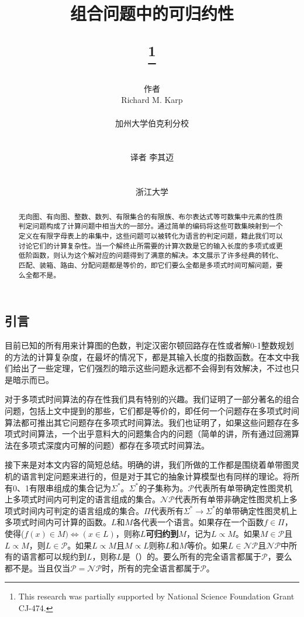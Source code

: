 \documentclass[twocolumn]{article}
\title{
    \begin{CJK}{UTF8}{gbsn}
    组合问题中的可归约性
    \end{CJK}
    \thanks{This research was partially supported by National Science Foundation Grant CJ-474.}
}
\author{
    \begin{CJK}{UTF8}{gbsn}
    作者
    \end{CJK}
    Richard M. Karp\\
    \begin{CJK}{UTF8}{gbsn}
    加州大学伯克利分校
    \end{CJK}
    \\
    \begin{CJK}{UTF8}{gbsn}
    译者 李其迈
    \end{CJK}
    \\
    \begin{CJK}{UTF8}{gbsn}
    浙江大学
    \end{CJK}
}
\date{}
\theoremstyle{nonumberplain}%
\begin{document}
\maketitle

\begin{CJK}{UTF8}{gbsn}
\renewcommand\abstractname{摘要}
\begin{abstract}
无向图、有向图、整数、数列、有限集合的有限族、布尔表达式等可数集中元素的性质判定问题构成了计算问题中相当大的一部分。通过简单的编码将这些可数集映射到一个定义在有限字母表上的串集中，这些问题可以被转化为语言的判定问题，籍此我们可以讨论它们的计算复杂性。当一个解终止所需要的计算次数是它的输入长度的多项式或更低阶函数，则认为这个解对应的问题得到了满意的解决。本文展示了许多经典的转化、匹配、装箱、路由、分配问题都是等价的，即它们要么全都是多项式时间可解问题，要么全都不是。
\end{abstract}

\section{引言}

    目前已知的所有用来计算图的色数，判定汉密尔顿回路存在性或者解0-1整数规划的方法的计算复杂度，在最坏的情况下，都是其输入长度的指数函数。在本文中我们给出了一些定理，它们强烈的暗示这些问题永远都不会得到有效解决，不过也只是暗示而已。

    对于多项式时间算法的存在性我们具有特别的兴趣。我们证明了一部分著名的组合问题，包括上文中提到的那些，它们都是等价的，即任何一个问题存在多项式时间算法都可推出其它问题存在多项式时间算法。我们也证明了，如果这些问题存在多项式时间算法，一个出乎意料大的问题集合内的问题（简单的讲，所有通过回溯算法在多项式深度内可解的问题）都存在多项式时间算法。

    接下来是对本文内容的简短总结。明确的讲，我们所做的工作都是围绕着单带图灵机的语言判定问题来进行的，但是对于其它的抽象计算模型也有同样的理论。将所有0、1有限串组成的集合记为$\Sigma^*$。$\Sigma^*$的子集称为{}。$\mathcal{P}$代表所有单带确定性图灵机上多项式时间内可判定的语言组成的集合。$\mathcal{NP}$代表所有单带非确定性图灵机上多项式时间内可判定的语言组成的集合。$\Pi$代表所有$\Sigma^*\to\Sigma^*$的单带确定性图灵机上多项式时间内可计算的函数。$L$和$M$各代表一个语言。如果存在一个函数$f\in\Pi$，使得($f(x)\in M)\Leftrightarrow(x\in L)$，则称$L${\bf 可归约到}$M$，记为$L\propto M$。如果$M\in\mathcal{P}$且$L\propto M$，则$L\in\mathcal{P}$。如果$L\propto M$且$M\propto L$则称$L$和$M$等价。如果$L\in\mathcal{NP}$且$\mathcal{NP}$中所有的语言都可以规约到$L$，则称$L$是（{}）{}的。要么所有的完全语言都属于$\mathcal{P}$，要么都不是。当且仅当$\mathcal{P} = \mathcal{NP}$时，所有的完全语言都属于$\mathcal{P}$。


\end{CJK}
\end{document}
